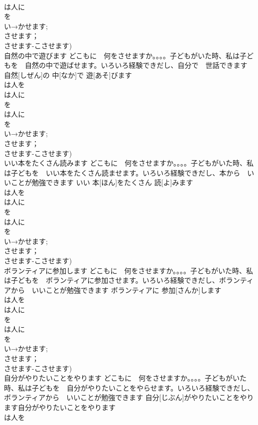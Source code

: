 \documentclass[8pt]{extreport}
\begin{document}
\begin{CJK}{UTF8}{min}
\\	は人に
\\	を
\\	い→かせます;
\\	させます；
\\	させます-こさせます)
\\	自然の中で遊びます	どこもに　何をさせますか。。。。子どもがいた時、私は子どもを　自然の中で遊ばせます。いろいろ経験できだし、自分で　世話できます	自然[しぜん]の 中[なか]で 遊[あそ]びます			
\\	は人を
\\	は人に
\\	を
\\	は人に
\\	を
\\	い→かせます;
\\	させます；
\\	させます-こさせます)
\\	いい本をたくさん読みます	どこもに　何をさせますか。。。。子どもがいた時、私は子どもを　いい本をたくさん読ませます。いろいろ経験できだし、本から　いいことが勉強できます	いい 本[ほん]をたくさん 読[よ]みます			
\\	は人を
\\	は人に
\\	を
\\	は人に
\\	を
\\	い→かせます;
\\	させます；
\\	させます-こさせます)
\\	ボランティアに参加します	どこもに　何をさせますか。。。。子どもがいた時、私は子どもを　ボランティアに参加させます。いろいろ経験できだし、ボランティアから　いいことが勉強できます	ボランティアに 参加[さんか]します			
\\	は人を
\\	は人に
\\	を
\\	は人に
\\	を
\\	い→かせます;
\\	させます；
\\	させます-こさせます)
\\	自分がやりたいことをやります	どこもに　何をさせますか。。。。子どもがいた時、私は子どもを　自分がやりたいことをやらせます。いろいろ経験できだし、ボランティアから　いいことが勉強できます	自分[じぶん]がやりたいことをやります自分がやりたいことをやります			
\\	は人を

\end{CJK}
\end{document}
